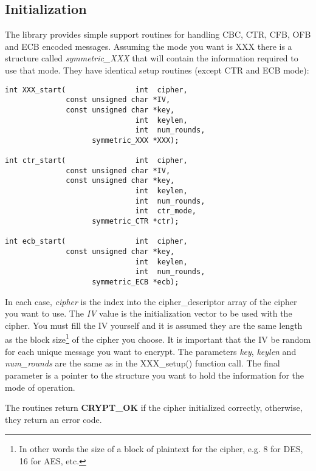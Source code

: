 \documentclass[synpaper]{book}
\begin{document}
\subsection{Initialization}
 
 
The library provides simple support routines for handling CBC, CTR, CFB, OFB and ECB encoded messages.  Assuming the mode
you want is XXX there is a structure called \textit{symmetric\_XXX} that will contain the information required to
use that mode.  They have identical setup routines (except CTR and ECB mode):
    
\begin{verbatim}
int XXX_start(                int  cipher,
              const unsigned char *IV,
              const unsigned char *key,
                              int  keylen,
                              int  num_rounds,
                    symmetric_XXX *XXX);

int ctr_start(                int  cipher,
              const unsigned char *IV,
              const unsigned char *key,
                              int  keylen,
                              int  num_rounds,
                              int  ctr_mode,
                    symmetric_CTR *ctr);

int ecb_start(                int  cipher,
              const unsigned char *key,
                              int  keylen,
                              int  num_rounds,
                    symmetric_ECB *ecb);
\end{verbatim}

In each case, \textit{cipher} is the index into the cipher\_descriptor array of the cipher you want to use.  The \textit{IV} value is
the initialization vector to be used with the cipher.  You must fill the IV yourself and it is assumed they are the same
length as the block size\footnote{In other words the size of a block of plaintext for the cipher, e.g. 8 for DES, 16 for AES, etc.}
of the cipher you choose.  It is important that the IV  be random for each unique message you want to encrypt.  The
parameters \textit{key}, \textit{keylen} and \textit{num\_rounds} are the same as in the XXX\_setup() function call.  The final parameter
is a pointer to the structure you want to hold the information for the mode of operation.

The routines return {\bf CRYPT\_OK} if the cipher initialized correctly, otherwise, they return an error code.
\end{document}
